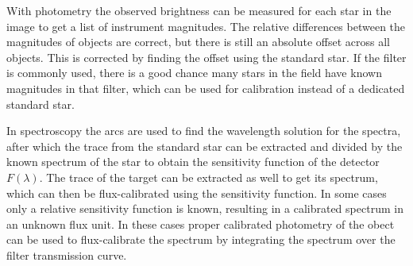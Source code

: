 \documentclass[a4paper,oneside,12pt, class=Latex/Classes/PhDthesisPSnPDF, crop=false]{standalone}
\begin{document}
With photometry the observed brightness can be measured for each star in the image to get a list of instrument magnitudes. The relative differences between the magnitudes of objects are correct, but there is still an absolute offset across all objects. This is corrected by finding the offset using the standard star. If the filter is commonly used, there is a good chance many stars in the field have known magnitudes in that filter, which can be used for calibration instead of a dedicated standard star.

In spectroscopy the arcs are used to find the wavelength solution for the spectra, after which the trace from the standard star can be extracted and divided by the known spectrum of the star to obtain the sensitivity function of the detector $F(\lambda)$. The trace of the target can be extracted as well to get its spectrum, which can then be flux-calibrated using the sensitivity function. In some cases only a relative sensitivity function is known, resulting in a calibrated spectrum in an unknown flux unit. In these cases proper calibrated photometry of the obect can be used to flux-calibrate the spectrum by integrating the spectrum over the filter transmission curve.
\end{document}
